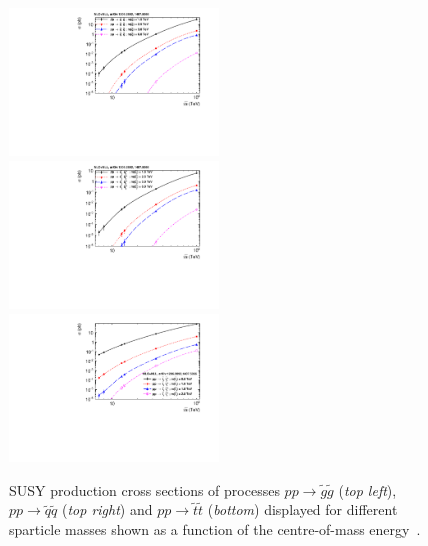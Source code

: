 \begin{figure}[!t]
  \centering
  \begin{minipage}[c]{1.\textwidth}
    \begin{center}
      \includegraphics[width=0.495\textwidth]{figures/gluino_xsec.pdf}  
      \includegraphics[width=0.495\textwidth]{figures/squark_xsec.pdf} \\
      \includegraphics[width=0.495\textwidth]{figures/stop_xsec.pdf}
    \end{center}
  \end{minipage}
  \caption{SUSY production cross sections of processes $pp \rightarrow \tilde{g}\tilde{g}$ (\textit{top left}), $pp \rightarrow \tilde{q}\tilde{q}$ (\textit{top right}) and $pp \rightarrow \tilde{t}\tilde{t}$ (\textit{bottom}) displayed for different sparticle masses shown as a function of the centre-of-mass energy~\cite{Kramer:2012bx, Borschensky:2014cia}.}
  \label{fig:susy_cross_sec}
\end{figure}
\\
